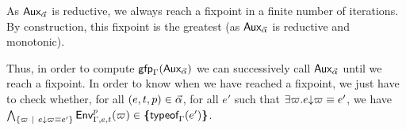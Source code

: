 \documentclass[a4paper]{article}
\theoremstyle{definition}
\begin{document}
    As $\textsf{Aux}_{\vec \alpha}$ is reductive, we always reach a fixpoint in a finite number of iterations.
    By construction, this fixpoint is the greatest (as $\textsf{Aux}_{\vec \alpha}$ is reductive and monotonic).

    Thus, in order to compute $\textsf{gfp}_\Gamma (\textsf{Aux}_{\vec \alpha})$ we can successively call $\textsf{Aux}_{\vec \alpha}$ until we reach a fixpoint.
    In order to know when we have reached a fixpoint, we just have to check whether, for all $(e,t,p) \in \vec \alpha$, for all $e'$ such that
    $\exists \varpi. e{\downarrow}\varpi \equiv e'$, we have $\bigwedge_{\{\varpi ~|~ e{\downarrow}\varpi \equiv e'\}} \textsf{Env}^{p}_{\Gamma,e,t} (\varpi) \in \textbf{\textup{\{}}\textsf{typeof}_{\Gamma}(e')\textbf{\textup{\}}}$.
\end{document}
